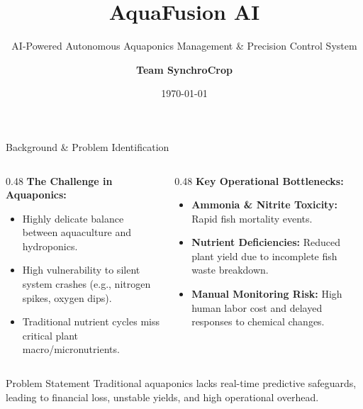 \documentclass[aspectratio=169, 10pt]{beamer}
\title[AquaFusion AI]{AquaFusion AI}
\subtitle{AI-Powered Autonomous Aquaponics Management \& Precision Control System}
\author[Team SynchroCrop]{\textbf{Team SynchroCrop}}
\date{\today}
\begin{document}
\begin{frame}
  \titlepage
\end{frame}

\begin{frame}{Background \& Problem Identification}
  \begin{columns}[T]
    \begin{column}{0.48\textwidth}
      \textbf{The Challenge in Aquaponics:}
      \begin{itemize}
        \item Highly delicate balance between aquaculture and hydroponics.
        \item High vulnerability to silent system crashes (e.g., nitrogen spikes, oxygen dips).
        \item Traditional nutrient cycles miss critical plant macro/micronutrients.
      \end{itemize}
    \end{column}
    
    \begin{column}{0.48\textwidth}
      \textbf{Key Operational Bottlenecks:}
      \begin{itemize}
        \item \textbf{Ammonia \& Nitrite Toxicity:} Rapid fish mortality events.
        \item \textbf{Nutrient Deficiencies:} Reduced plant yield due to incomplete fish waste breakdown.
        \item \textbf{Manual Monitoring Risk:} High human labor cost and delayed responses to chemical changes.
      \end{itemize}
    \end{column}
  \end{columns}
  
  \vspace{0.5cm}
  \begin{block}{Problem Statement}
    Traditional aquaponics lacks real-time predictive safeguards, leading to financial loss, unstable yields, and high operational overhead.
  \end{block}
\end{frame}
\end{document}

